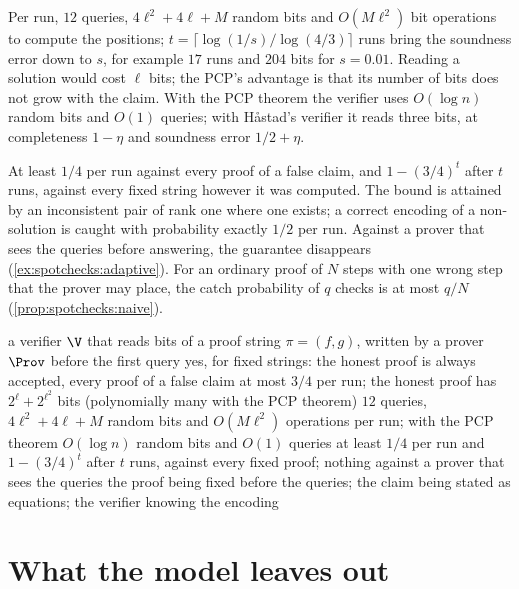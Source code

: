 \begin{refsection}
\questiontwo Per run, $12$ queries, $4\ell^2+4\ell+M$ random bits and $O(M\ell^2)$ bit operations to compute the positions; $t=\lceil\log(1/s)/\log(4/3)\rceil$ runs bring the soundness error down to $s$, for example $17$ runs and $204$ bits for $s=0.01$. Reading a solution would cost $\ell$ bits; the PCP's advantage is that its number of bits does not grow with the claim. With the PCP theorem the verifier uses $O(\log n)$ random bits and $O(1)$ queries; with Håstad's verifier it reads three bits, at completeness $1-\eta$ and soundness error $1/2+\eta$.

\questionthree At least $1/4$ per run against every proof of a false claim, and $1-(3/4)^t$ after $t$ runs, against every fixed string however it was computed. The bound is attained by an inconsistent pair of rank one where one exists; a correct encoding of a non-solution is caught with probability exactly $1/2$ per run. Against a prover that sees the queries before answering, the guarantee disappears (\cref{ex:spotchecks:adaptive}). For an ordinary proof of $N$ steps with one wrong step that the prover may place, the catch probability of $q$ checks is at most $q/N$ (\cref{prop:spotchecks:naive}).

{a verifier $\V$ that reads bits of a proof string $\pi=(f,g)$, written by a prover $\Prov$ before the first query}
{yes, for fixed strings: the honest proof is always accepted, every proof of a false claim at most $3/4$ per run; the honest proof has $2^\ell+2^{\ell^2}$ bits (polynomially many with the PCP theorem)}
{$12$ queries, $4\ell^2+4\ell+M$ random bits and $O(M\ell^2)$ operations per run; with the PCP theorem $O(\log n)$ random bits and $O(1)$ queries}
{at least $1/4$ per run and $1-(3/4)^t$ after $t$ runs, against every fixed proof; nothing against a prover that sees the queries}
{the proof being fixed before the queries; the claim being stated as equations; the verifier knowing the encoding}

\section{What the model leaves out}\label{sec:spotchecks:leavesout}


\end{refsection}
